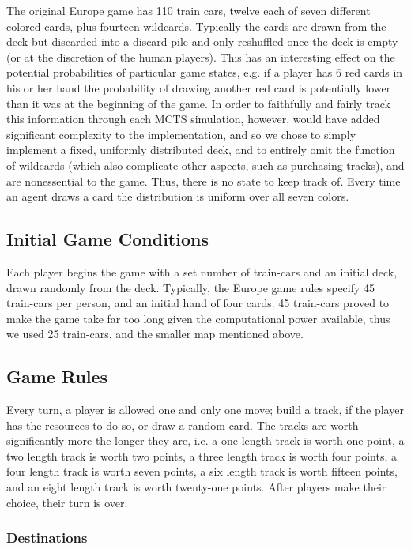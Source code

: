 \documentclass[11pt, letterpaper, twoside]{article}
\begin{document}
The original Europe game has 110 train cars, twelve each of seven different colored cards, plus fourteen wildcards. Typically the cards are drawn from the deck but discarded into a discard pile and only reshuffled once the deck is empty (or at the discretion of the human players). This has an interesting effect on the potential probabilities of particular game states, e.g. if a player has 6 red cards in his or her hand the probability of drawing another red card is potentially lower than it was at the beginning of the game. In order to faithfully and fairly track this information through each MCTS simulation, however, would have added significant complexity to the implementation, and so we chose to simply implement a fixed, uniformly distributed deck, and to entirely omit the function of wildcards (which also complicate other aspects, such as purchasing tracks), and are nonessential to the game. Thus, there is no state to keep track of. Every time an agent draws a card the distribution is uniform over all seven colors.

\subsection{Initial Game Conditions}

Each player begins the game with a set number of train-cars and an initial deck, drawn randomly from the deck. Typically, the Europe game rules specify 45 train-cars per person, and an initial hand of four cards. 45 train-cars proved to make the game take far too long given the computational power available, thus we used 25 train-cars, and the smaller map mentioned above. 

\subsection{Game Rules}

Every turn, a player is allowed one and only one move; build a track, if the player has the resources to do so, or draw a random card. The tracks are worth significantly more the longer they are, i.e. a one length track is worth one point, a two length track is worth two points, a three length track is worth four points, a four length track is worth seven points, a six length track is worth fifteen points, and an eight length track is worth twenty-one points. After players make their choice, their turn is over. 

\subsubsection{Destinations}
\end{document}
